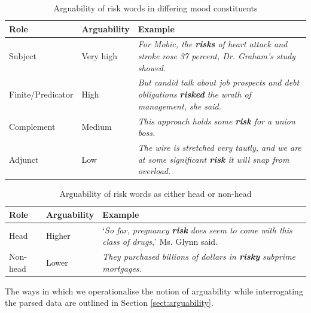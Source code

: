     \begin{table}
    \centering
    \footnotesize
    \begin{tabularx}{.70\textwidth}{|L{.50}|L{.50}|L{2}|}%
    \hline
    \textbf{Role}              & \textbf{Arguability} & \textbf{Example} \\ \hline
    Subject           & Very high   & \emph{For Mobic, the \textbf{risks} of heart attack and stroke rose 37 percent, Dr. Graham's study showed.}       \\ \hline
    Finite\slash Predicator & High        & \emph{But candid talk about job prospects and debt obligations \textbf{risked} the wrath of management, she said.}       \\ \hline
    Complement        & Medium      & \emph{This approach holds some \textbf{risk} for a union boss.}       \\ \hline
    Adjunct           & Low         & \emph{The wire is stretched very tautly, and we are at some significant \textbf{risk} it will snap from overload.}       \\ \hline
    \end{tabularx}
    \caption{Arguability of risk words in differing mood constituents}
    \end{table}

    \begin{table}
    \centering
    \footnotesize
    \begin{tabularx}{.70\textwidth}{|L{.50}|L{.50}|L{2}|}%
    \hline
    \textbf{Role}              & \textbf{Arguability} & \textbf{Example} \\ \hline
    Head           & Higher   & `\emph{So far, pregnancy \textbf{risk} does seem to come with this class of drugs},' Ms. Glynn said.       \\ \hline
    Non-head   & Lower   & \emph{They purchased billions of dollars in \textbf{risky} subprime mortgages.}       \\ \hline
    \end{tabularx}
    \caption{Arguability of risk words as either head or non-head}
    \end{table}

        The ways in which we operationalise the notion of arguability while interrogating the parsed data are outlined in Section \ref{sect:arguability}.

		

